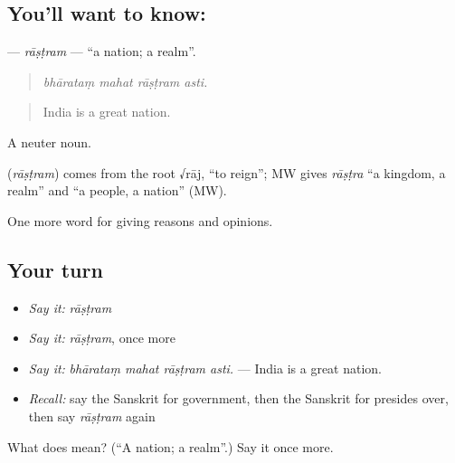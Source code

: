 \subsection*{You'll want to know: }
\textbf{} — \emph{rāṣṭram} — \textquotedblleft{}a nation; a realm\textquotedblright{}.

\begin{quote}
   
\end{quote}

\begin{quote}
\emph{bhārataṃ mahat rāṣṭram asti.}
\end{quote}

\begin{quote}
India is a great nation.
\end{quote}

A neuter noun.

\begin{cousinweb}
\textbf{} (\emph{rāṣṭram}) comes from the root √rāj, \textquotedblleft{}to reign\textquotedblright{}; MW gives \emph{rāṣṭra} \textquotedblleft{}a kingdom, a realm\textquotedblright{} and \textquotedblleft{}a people, a nation\textquotedblright{} (MW).
\end{cousinweb}

\begin{grammarlens}[title={What you've built}]
One more word for giving reasons and opinions.
\end{grammarlens}

\subsection*{Your turn}
\begin{itemize}
\raggedright
  \item \emph{Say it:} \emph{rāṣṭram}
  \item \emph{Say it:} \emph{rāṣṭram}, once more
  \item \emph{Say it:} \emph{bhārataṃ mahat rāṣṭram asti.} — India is a great nation.
  \item \emph{Recall:} say the Sanskrit for government, then the Sanskrit for presides over, then say \emph{rāṣṭram} again
\end{itemize}

\begin{tcolorbox}[breakable,colback=teal!4,colframe=teal!35!black,title={Before you move on}]
What does  mean? (\textquotedblleft{}A nation; a realm\textquotedblright{}.) Say it once more.
\end{tcolorbox}
